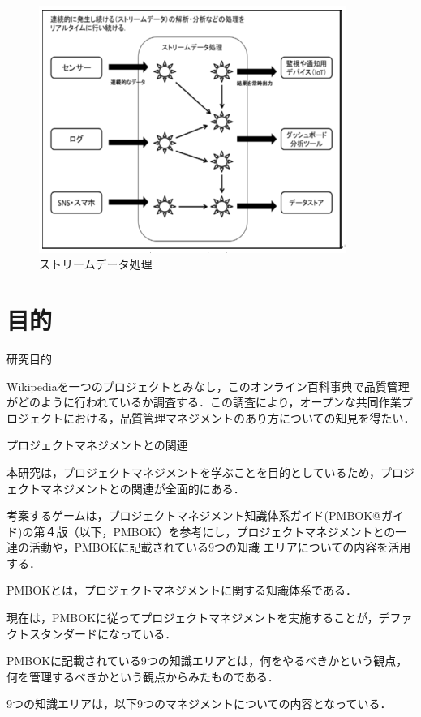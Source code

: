 \begin{figure}[H]
\centering
\includegraphics[width=10cm]{streamdatasyori.png}
\caption{ストリームデータ処理}\label{サンプル図}
\end{figure}





\chapter{目的}

研究目的

Wikipediaを一つのプロジェクトとみなし，このオンライン百科事典で品質管理がどのように行われているか調査する．この調査により，オープンな共同作業プロジェクトにおける，品質管理マネジメントのあり方についての知見を得たい．


プロジェクトマネジメントとの関連

本研究は，プロジェクトマネジメントを学ぶことを目的としているため，プロジェクトマネジメントとの関連が全面的にある．

考案するゲームは，プロジェクトマネジメント知識体系ガイド(PMBOK@ガイド)の第４版（以下，PMBOK）を参考にし，プロジェクトマネジメントとの一連の活動や，PMBOKに記載されている9つの知識
エリアについての内容を活用する．\cite{PMBOK}

PMBOKとは，プロジェクトマネジメントに関する知識体系である．

現在は，PMBOKに従ってプロジェクトマネジメントを実施することが，デファクトスタンダードになっている．

PMBOKに記載されている9つの知識エリアとは，何をやるべきかという観点，何を管理するべきかという観点からみたものである．

9つの知識エリアは，以下9つのマネジメントについての内容となっている．


